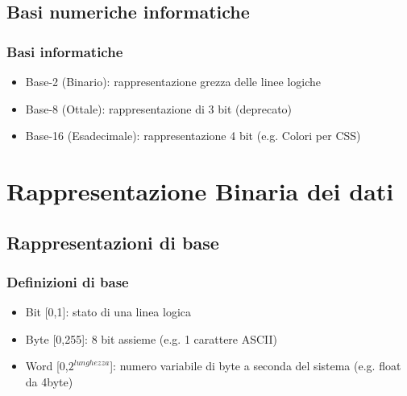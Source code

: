 \documentclass{beamer}
\begin{document}
	\subsection{Basi numeriche informatiche}
  \begin{frame}
    \frametitle{Basi informatiche}
    \begin{itemize}
    		\item Base-2 (Binario): rappresentazione grezza delle linee logiche
    		\item Base-8 (Ottale): rappresentazione di 3 bit (deprecato)
    		\item Base-16 (Esadecimale): rappresentazione 4 bit (e.g. Colori per CSS)
    \end{itemize}
  \end{frame}


	\section[BinaryData]{Rappresentazione Binaria dei dati}
	\subsection{Rappresentazioni di base}  
  \begin{frame}
    \frametitle{Definizioni di base}    	
    \begin{itemize}
    		\item Bit [0,1]: stato di una linea logica
    		\item Byte [0,255]: 8 bit assieme (e.g. 1 carattere ASCII)
    		\item Word [0,$2^{lunghezza}$]: numero variabile di byte a seconda del sistema (e.g. float da 4byte)
    \end{itemize}
  \end{frame}
\end{document}
